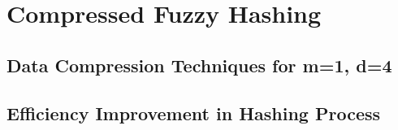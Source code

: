 \section{Compressed Fuzzy Hashing}

\subsection{Data Compression Techniques for m=1, d=4}

\subsection{Efficiency Improvement in Hashing Process}